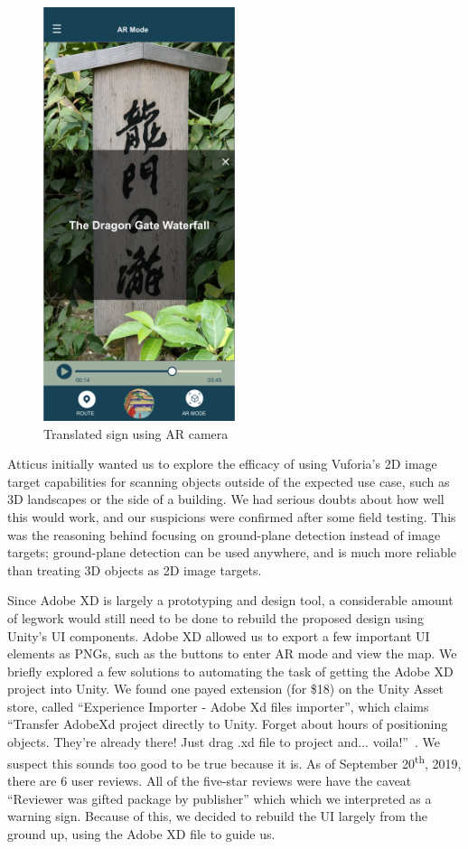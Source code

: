 \documentclass[a4paper, 10pt, american, titlepage]{article}
\begin{document}
\begin{figure}[h] \centering
    \includegraphics[width=0.5\textwidth]{sign-translation.png}
    \caption{Translated sign using AR camera}
    \label{fig:signTranslation}
\end{figure}

Atticus initially wanted us to explore the efficacy of using Vuforia's 2D image
target capabilities for scanning objects outside of the expected use case, such
as 3D landscapes or the side of a building. We had serious doubts about how
well this would work, and our suspicions were confirmed after some field
testing. This was the reasoning behind focusing on ground-plane detection
instead of image targets; ground-plane detection can be used anywhere, and is
much more reliable than treating 3D objects as 2D image targets.

Since Adobe XD is largely a prototyping and design tool, a considerable amount
of legwork would still need to be done to rebuild the proposed design using
Unity's UI components. Adobe XD allowed us to export a few important UI
elements as PNGs, such as the buttons to enter AR mode and view the map. We
briefly explored a few solutions to automating the task of getting the Adobe XD
project into Unity. We found one payed extension (for \$18) on the Unity Asset
store, called ``Experience Importer - Adobe Xd files importer'', which claims
``Transfer AdobeXd project directly to Unity. Forget about hours of positioning
objects. They're already there! Just drag .xd file to project and...
voila!''~\autocite{glasseye2019}.  We suspect this sounds too good to be true
because it is. As of September 20\textsuperscript{th}, 2019, there are 6 user
reviews. All of the five-star reviews were have the caveat ``Reviewer was gifted
package by publisher'' which which we interpreted as a warning sign. Because of
this, we decided to rebuild the UI largely from the ground up, using the Adobe XD
file to guide us.
\end{document}
